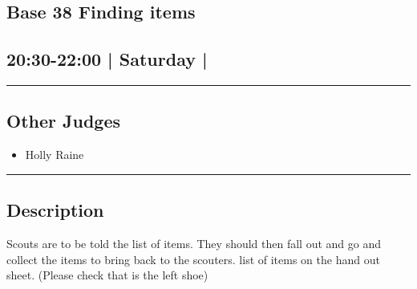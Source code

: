 \documentclass[10pt, A5]{article}
\begin{document}
		\begin{framed}
			\begin{minipage}{\textwidth}

			\setcounter{section}{80}
							\section{\faStar \: Base 38 \faStar \: Finding items}
						
			\subsection*{20:30-22:00 | Saturday | }

			\vspace{0.25cm}
			\hrule
			\vspace{0.25cm}


			\subsection*{Other Judges}
							

				\begin{multicols}{2}

			\begin{itemize}
											\item Holly Raine
								\end{itemize}

			\vfill\null
			\columnbreak

			\begin{itemize}
								\end{itemize}

			\vfill\null

			\end{multicols}

			\vspace{0.25cm}
			\hrule
			\vspace{0.25cm}

			\begin{minipage}{\textwidth}
			\subsection*{\faListAlt \: Description}
			Scouts are to be told the list of items. They should then fall out and go and collect the items to bring back to the scouters. list of items on the hand out sheet. (Please check that is the left shoe)
			\end{minipage}


	\end{minipage}
	\end{framed}
\end{document}
